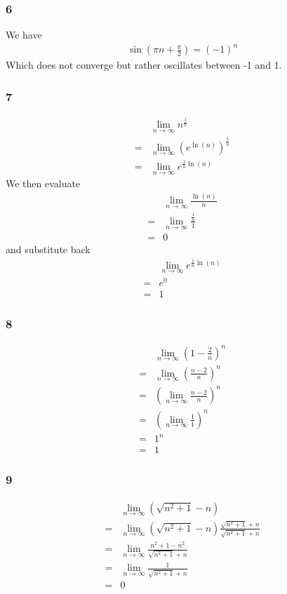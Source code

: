\documentclass[12pt]{article}
\newcommand{\round}[1]{\left(       #1 \right)      }
\begin{document}
\subsubsection*{6}
We have
\begin{align*}
    \sin\round{\pi n + \frac{\pi}{2}} = (-1)^n
\end{align*}
Which does not converge but rather oscillates between -1 and 1.

\subsubsection*{7}
\begin{align*}
     & \lim_{n\to\infty} n^\frac{1}{n} \\
    =& \lim_{n\to\infty} \round{e^{\ln(n)}}^\frac{1}{n} \\
    =& \lim_{n\to\infty} e^{\frac{1}{n} \ln(n)}
\end{align*}
We then evaluate
\begin{align*}
     & \lim_{n\to\infty} \frac{\ln(n)}{n} \\
    =& \lim_{n\to\infty} \frac{\frac{1}{n}}{1} \\
    =& 0
\end{align*}
and substitute back
\begin{align*}
     & \lim_{n\to\infty} e^{\frac{1}{n} \ln(n)} \\
    =& e^0 \\
    =& 1
\end{align*}

\subsubsection*{8}
\begin{align*}
     & \lim_{n\to\infty} \round{1 - \frac{2}{n}}^n \\
    =& \lim_{n\to\infty} \round{\frac{n-2}{n}}^n \\
    =& \round{\lim_{n\to\infty} \frac{n-2}{n}}^n \\
    =& \round{\lim_{n\to\infty} \frac{1}{1}}^n \\
    =& 1^n \\
    =& 1
\end{align*}

\subsubsection*{9}
\begin{align*}
     & \lim_{n\to\infty} \round{\sqrt{n^2 + 1} - n} \\
    =& \lim_{n\to\infty} \round{\sqrt{n^2 + 1} - n}\frac{\sqrt{n^2 + 1} + n}{\sqrt{n^2 + 1} + n} \\
    =& \lim_{n\to\infty} \frac{n^2 + 1 - n^2}{\sqrt{n^2 + 1} + n} \\
    =& \lim_{n\to\infty} \frac{1}{\sqrt{n^2 + 1} + n} \\
    =& 0
\end{align*}
\end{document}
